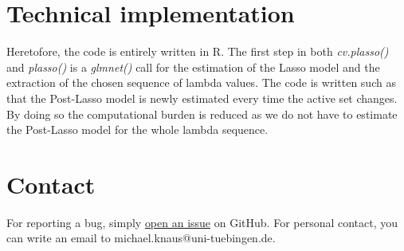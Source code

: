 \documentclass[12pt]{article}
\begin{document}
\section{Technical implementation}

Heretofore, the code is entirely written in R. The first step in both \emph{cv.plasso()} and \emph{plasso()} is a \emph{glmnet()} call for the estimation of the Lasso model and the extraction of the chosen sequence of lambda values. The code is written such as that the Post-Lasso model is newly estimated every time the active set changes. By doing so the computational burden is reduced as we do not have to estimate the Post-Lasso model for the whole lambda sequence.

\section{Contact}

For reporting a bug, simply \href{https://github.com/stefan-1997/NuisanceParameters/issues/new}{open an issue} on GitHub. For personal contact, you can write an email to michael.knaus@uni-tuebingen.de.


\end{document}
